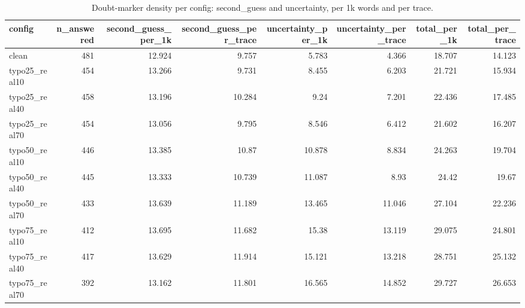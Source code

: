 \documentclass[11pt]{article}
\begin{document}
\begin{table}[H]
\centering
\caption{Doubt-marker density per config: second\_guess and uncertainty, per 1k words and per trace.}
\small
\begin{adjustbox}{max width=\textwidth}
\begin{tabular}{lrrrrrrr}
\toprule
\textbf{config} & \textbf{n\_answered} & \textbf{second\_guess\_per\_1k} & \textbf{second\_guess\_per\_trace} & \textbf{uncertainty\_per\_1k} & \textbf{uncertainty\_per\_trace} & \textbf{total\_per\_1k} & \textbf{total\_per\_trace} \\
\midrule
clean & 481 & 12.924 & 9.757 & 5.783 & 4.366 & 18.707 & 14.123 \\
typo25\_real10 & 454 & 13.266 & 9.731 & 8.455 & 6.203 & 21.721 & 15.934 \\
typo25\_real40 & 458 & 13.196 & 10.284 & 9.24 & 7.201 & 22.436 & 17.485 \\
typo25\_real70 & 454 & 13.056 & 9.795 & 8.546 & 6.412 & 21.602 & 16.207 \\
typo50\_real10 & 446 & 13.385 & 10.87 & 10.878 & 8.834 & 24.263 & 19.704 \\
typo50\_real40 & 445 & 13.333 & 10.739 & 11.087 & 8.93 & 24.42 & 19.67 \\
typo50\_real70 & 433 & 13.639 & 11.189 & 13.465 & 11.046 & 27.104 & 22.236 \\
typo75\_real10 & 412 & 13.695 & 11.682 & 15.38 & 13.119 & 29.075 & 24.801 \\
typo75\_real40 & 417 & 13.629 & 11.914 & 15.121 & 13.218 & 28.751 & 25.132 \\
typo75\_real70 & 392 & 13.162 & 11.801 & 16.565 & 14.852 & 29.727 & 26.653 \\
\bottomrule
\end{tabular}
\end{adjustbox}
\end{table}
\end{document}
